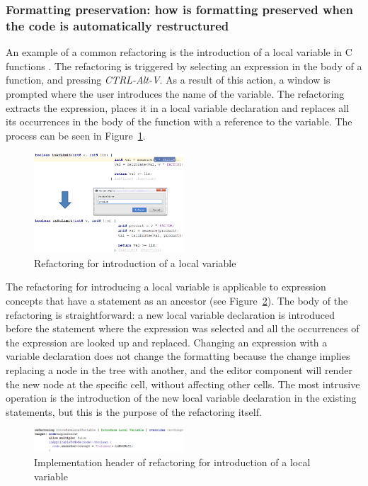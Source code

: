 \documentclass[preprint,numbers,10pt]{sigplanconf}
\begin{document}
\subsubsection{Formatting preservation: how is formatting preserved when the code is automatically restructured}
An example of a common refactoring is the introduction of a local variable in C functions \cite{voelter2014generic}.
The refactoring is triggered by selecting an expression in the body of a function, and pressing \emph{CTRL-Alt-V}.
As a result of this action, a window is prompted where the user introduces the name of the variable.
The refactoring extracts the expression, places it in a
local variable declaration and replaces all its occurrences in the body of the function with a reference to the variable.
The process can be seen in Figure~\ref{fig:IntroLocalVar}.

\begin{figure}[H]
	\centering
	\includegraphics[width=0.50\textwidth]{screens/IntroLocalVar.png}
	\caption{Refactoring for introduction of a local variable}
	\label{fig:IntroLocalVar}
\end{figure}

The refactoring for introducing a local variable is applicable to expression concepts that have a statement as an
ancestor (see Figure~\ref{fig:RefactoringImpl}). The body of the refactoring is straightforward:
a new local variable declaration is introduced before the statement where the expression was selected and all
the occurrences of the expression are looked up and replaced. Changing an expression with a variable declaration
does not change the formatting because the change implies replacing a node in the tree with another, and the editor
component will render the new node at the specific cell, without affecting other cells. The most intrusive operation is the
introduction of the new local variable declaration in the existing statements, but this is the purpose of the
refactoring itself.

\begin{figure}[H]
	\centering
	\includegraphics[width=0.50\textwidth]{screens/RefactoringImpl.png}
	\caption{Implementation header of refactoring for introduction of a local variable}
	\label{fig:RefactoringImpl}
\end{figure}
\end{document}
